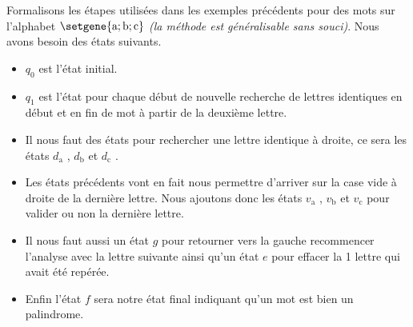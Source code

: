 Formalisons les étapes utilisées dans les exemples précédents pour des mots sur l'alphabet $\setgene{\text{a} ; \text{b} ; \text{c}}$ \emph{(la méthode est généralisable sans souci)}. Nous avons besoin des états suivants.

\begin{itemize}[label = \small\textbullet]
    \item $q_0$ est l'état initial.

    \item $q_1$ est l'état pour chaque début de nouvelle recherche de lettres identiques en début et en fin de mot à partir de la deuxième lettre.

    \item Il nous faut des états pour rechercher une lettre identique à droite, ce sera les états $d_\text{a}$ , $d_\text{b}$ et $d_\text{c}$ .

    \item Les états précédents vont en fait nous permettre d'arriver sur la case vide à droite de la dernière lettre. Nous ajoutons donc les états $v_\text{a}$ , $v_\text{b}$ et $v_\text{c}$ pour valider ou non la dernière lettre.

    \item Il nous faut aussi un état $g$ pour retourner vers la gauche recommencer l'analyse avec la lettre suivante ainsi qu'un état $e$ pour effacer la 1\iere{} lettre qui avait été repérée.

    \item Enfin l'état $f$ sera notre état final indiquant qu'un mot est bien un palindrome.
\end{itemize}

